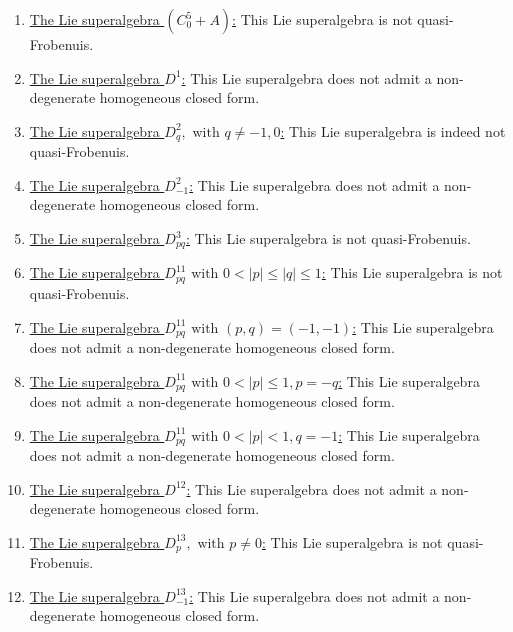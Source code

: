 \documentclass[12pt]{amsart}
\begin{document}
\begin{enumerate}
    \item \underline{The Lie superalgebra $(C^5_{0}+A)$:} This Lie superalgebra is not quasi-Frobenuis. 

    \item \underline{The Lie superalgebra  $D^1$:} This Lie superalgebra does not admit a non-degenerate homogeneous closed form.

    \item \underline{The Lie superalgebra  $D^2_q, \text{ with } q \not =-1,0 $:} This Lie superalgebra is indeed not quasi-Frobenuis. 

    \item \underline{The Lie superalgebra  $D^2_{-1}$:} This Lie superalgebra does not admit a non-degenerate homogeneous closed form.

    \item \underline{The Lie superalgebra  $D^3_{pq}$:} This Lie superalgebra is not quasi-Frobenuis. 

    \item \underline{The Lie superalgebra  $D^{11}_{pq} \text{ with } 0< |p|\leq |q|\leq 1$:} This Lie superalgebra is not quasi-Frobenuis. 

    \item \underline{The Lie superalgebra  $D^{11}_{pq} \text{ with } (p,q)=(-1,-1)$:} This Lie superalgebra does not admit a non-degenerate homogeneous closed form.

    \item \underline{The Lie superalgebra  $D^{11}_{pq} \text{ with } 0< |p|\leq 1 , p=-q $:} This Lie superalgebra does not admit a non-degenerate homogeneous closed form.

    \item \underline{The Lie superalgebra  $D^{11}_{pq} \text{ with } 0< |p|< 1, q=-1$:} This Lie superalgebra does not admit a non-degenerate homogeneous closed form.

    \item \underline{The Lie superalgebra  $D^{12}$:} This Lie superalgebra does not admit a non-degenerate homogeneous closed form.

    \item \underline{The Lie superalgebra  $D^{13}_p,\text{ with } p\not =0$:} This Lie superalgebra is not quasi-Frobenuis. 

    \item \underline{The Lie superalgebra  $D^{13}_{-1}$:} This Lie superalgebra does not admit a non-degenerate homogeneous closed form.


\end{enumerate}
\end{document}
